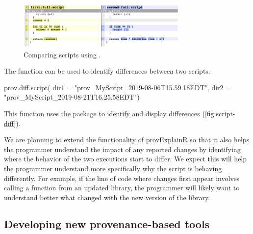 %

\begin{figure}[tb]
    \centering
    \includegraphics[width=0.75\textwidth]{figures/script-diff2.png}
    \caption{Comparing scripts using . 
    }
    \label{fig:script-diff}
\end{figure}

The  function can be used to identify differences between two scripts.
\begin{example}
prov.diff.script(
  dir1 = "prov_MyScript_2019-08-06T15.59.18EDT", 
  dir2 = "prov_MyScript_2019-08-21T16.25.58EDT")
\end{example}
This function uses the  package to identify and display differences (\autoref{fig:script-diff}).

%

We are planning to extend the functionality of provExplainR so that it also helps the programmer understand the impact of any reported changes by identifying where the behavior of the two executions start to differ.  We expect this will help the programmer understand more specifically why the script is behaving differently.  For example, if the line of code where changes first appear involves calling a function from an updated library, the programmer will likely want to understand better what changed with the new version of the library.



\subsection{Developing new provenance-based tools}

